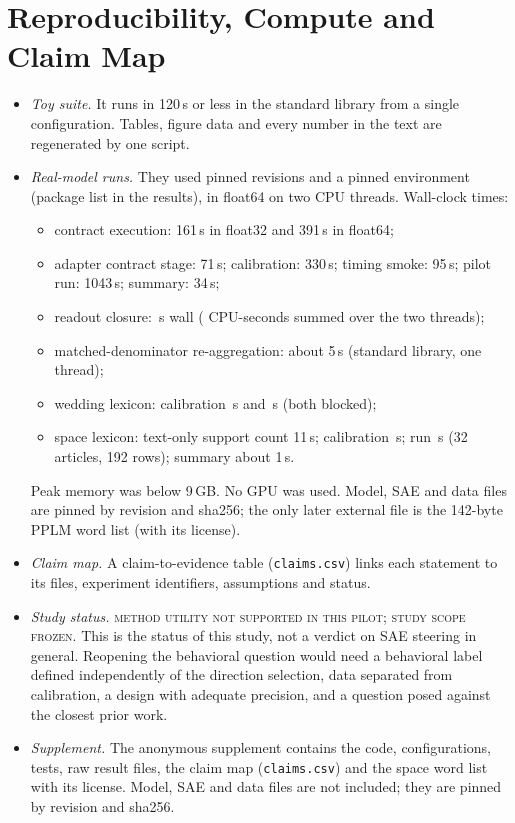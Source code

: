 \documentclass{article}
\theoremstyle{plain}
\theoremstyle{definition}
\theoremstyle{remark}
\begin{document}
\section{Reproducibility, Compute and Claim Map}
\label{app:repro}
\begin{itemize}
  \item \emph{Toy suite.} It runs in 120\,s or less in the standard library from a single
  configuration. Tables, figure data and every number in the text are regenerated by one
  script.
  \item \emph{Real-model runs.} They used pinned revisions and a pinned environment
  (package list in the results), in float64 on two CPU threads. Wall-clock times:
  \begin{itemize}
    \item contract execution: 161\,s in float32 and 391\,s in float64;
    \item adapter contract stage: 71\,s; calibration: 330\,s; timing smoke: 95\,s;
    pilot run: 1043\,s; summary: 34\,s;
    \item readout closure: \ClWall\,s wall (\ClCPU{} CPU-seconds summed over the two threads);
    \item matched-denominator re-aggregation: about 5\,s (standard library, one thread);
    \item wedding lexicon: calibration \LxCalSecVOne\,s and \LxCalSecVOneOne\,s (both blocked);
    \item space lexicon: text-only support count 11\,s; calibration \SpCalSec\,s; run
    \SpRunSec\,s (32 articles, 192 rows); summary about 1\,s.
  \end{itemize}
  Peak memory was below 9\,GB. No GPU was used. Model, SAE and data files are pinned by
  revision and sha256; the only later external file is the 142-byte PPLM word list (with its
  license).
  \item \emph{Claim map.} A claim-to-evidence table (\texttt{claims.csv}) links each
  statement to its files, experiment identifiers, assumptions and status.
  \item \emph{Study status.} \textsc{method utility not supported in this pilot};
  \textsc{study scope frozen}. This is the status of this study, not a verdict on SAE
  steering in general. Reopening the behavioral question would need a behavioral label
  defined independently of the direction selection, data separated from calibration, a
  design with adequate precision, and a question posed against the closest prior work.
  \item \emph{Supplement.} The anonymous supplement contains the code, configurations,
  tests, raw result files, the claim map (\texttt{claims.csv}) and the space word list with its
  license. Model, SAE and data files are not included; they are pinned by revision and
  sha256.
\end{itemize}
\end{document}
